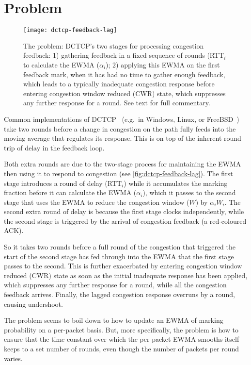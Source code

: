 \section{Problem}\label{prresp_Problem}

\begin{figure*}
	\texttt{[image: dctcp-feedback-lag]}
	\caption{The problem: DCTCP's two stages for processing congestion feedback: 1) gathering feedback in a fixed sequence of rounds (RTT\(_i\) to calculate the EWMA (\(\alpha_i\)); 2) applying this EWMA on the first feedback mark, when it has had no time to gather enough feedback, which leads to a typically inadequate congestion response before entering congestion window reduced (CWR) state, which suppresses any further response for a round. See text for full commentary.}
	\label{fig:dctcp-feedback-lag}
\end{figure*}

Common implementations of DCTCP~\cite{Alizadeh10:DCTCP} (e.g.\ in Windows, Linux, or FreeBSD~\cite{Bensley17:DCTCP}) take two rounds before a change in congestion on the path fully feeds into the moving average that regulates its response. This is on top of the inherent round trip of delay in the feedback loop.

Both extra rounds are due to the two-stage process for maintaining the EWMA then using it to respond to congestion (see \autoref{fig:dctcp-feedback-lag}). The first stage introduces a round of delay (RTT\(_i\)) while it accumulates the marking fraction before it can calculate the EWMA (\(\alpha_i\)), which it passes to the second stage that uses the EWMA to reduce the congestion window (\(W\)) by \(\alpha_i W_i\). The second extra round of delay is because the first stage clocks independently, while the second stage is triggered by the arrival of congestion feedback (a red-coloured ACK).

So it takes two rounds before a full round of the congestion that triggered the start of the second stage has fed through into the EWMA that the first stage passes to the second. This is further exacerbated by entering congestion window reduced (CWR) state as soon as the initial inadequate response has been applied, which suppresses any further response for a round, while all the congestion feedback arrives. Finally, the lagged congestion response overruns by a round, causing undershoot.

The problem seems to boil down to how to update an EWMA of marking probability on a per-packet basis. But, more specifically, the problem is how to ensure that the time constant over which the per-packet EWMA smooths itself keeps to a set number of rounds, even though the number of packets per round varies.

